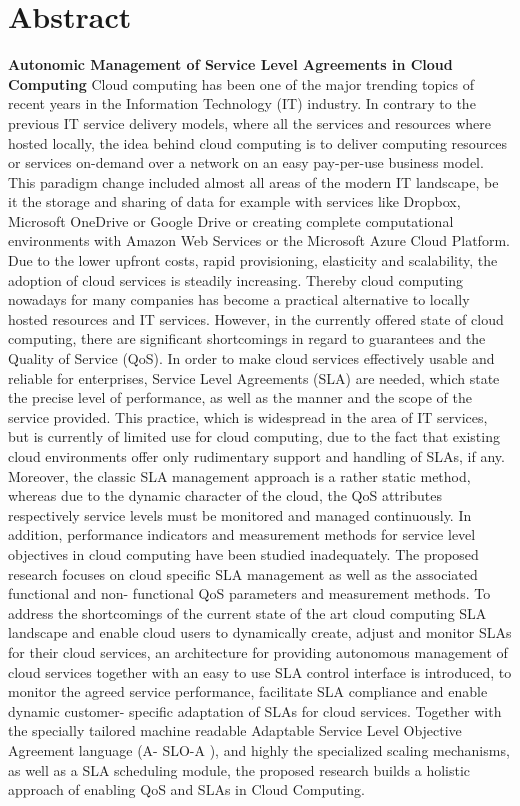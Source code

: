 \chapter*{Abstract}
\begin{SingleSpace}
\textbf{Autonomic Management of Service Level Agreements in Cloud Computing}
	Cloud computing has been one of the major trending topics of recent years in the Information Technology (IT) industry. In contrary to the previous IT service delivery models, where all the services and resources where hosted locally, the idea behind cloud computing is to deliver computing resources or services on-demand over a network on an easy pay-per-use business model. This paradigm change included almost all areas of the modern IT landscape, be it the storage and sharing of data for example with services like Dropbox, Microsoft OneDrive or Google Drive or creating complete computational environments with Amazon Web Services or the Microsoft Azure Cloud Platform. Due to the lower upfront costs, rapid provisioning, elasticity and scalability, the adoption of cloud services is steadily increasing. Thereby cloud computing nowadays for many companies has become a practical alternative to locally hosted resources and IT services.
	However, in the currently offered state of cloud computing, there are significant shortcomings in regard to guarantees and the Quality of Service (QoS). In order to make cloud services effectively usable and reliable for enterprises, Service Level Agreements (SLA) are needed, which state the precise level of performance, as well as the manner and the scope of the service provided. This practice, which is widespread in the area of IT services, but is currently of limited use for cloud computing, due to the fact that existing cloud environments offer only rudimentary support and handling of SLAs, if any.
	Moreover, the classic SLA management approach is a rather static method, whereas due to the dynamic character of the cloud, the QoS attributes respectively service levels must be monitored and managed continuously. In addition, performance indicators and measurement methods for service level objectives in cloud computing have been studied inadequately.
	The proposed research focuses on cloud specific SLA management as well as the associated functional and non- functional QoS parameters and measurement methods. To address the shortcomings of the current state of the art cloud computing SLA landscape and enable cloud users to dynamically create, adjust and monitor SLAs for their cloud services, an architecture for providing autonomous management of cloud services together with an easy to use SLA control interface is introduced, to monitor the agreed service performance, facilitate SLA compliance and enable dynamic customer- specific adaptation of SLAs for cloud services. Together with the specially tailored machine readable Adaptable Service Level Objective Agreement language (A- SLO-A ), and highly the specialized scaling mechanisms, as well as a SLA scheduling module, the proposed research builds a holistic approach of enabling QoS and SLAs in Cloud Computing.
\end{SingleSpace}
\clearpage



